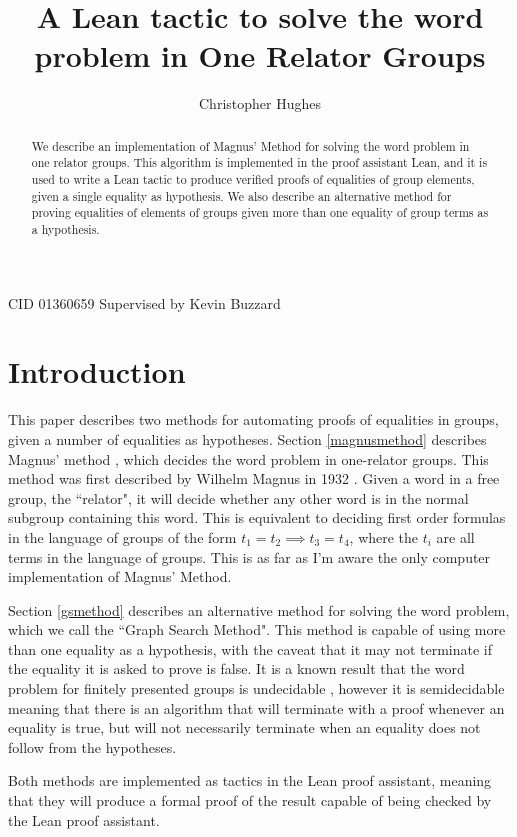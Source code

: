 \documentclass[12pt]{article} %
\title{A Lean tactic to solve the word problem in One Relator Groups}
\author{Christopher Hughes}
\theoremstyle{definition}
\theoremstyle{definition}
\theoremstyle{definition}
\theoremstyle{definition}
\begin{document}
\maketitle
CID 01360659 \newline
Supervised by Kevin Buzzard
\begin{abstract}
  We describe an implementation of Magnus' Method for solving the word problem in one relator
  groups. This algorithm is implemented in the proof assistant Lean, and it is used to
  write a Lean tactic to produce verified proofs of equalities of group elements, given
  a single equality as hypothesis. We also describe an alternative method for
  proving equalities of elements of groups given more than one equality of group terms
  as a hypothesis.
\end{abstract}
\pagebreak
\tableofcontents
\pagebreak

\section{Introduction}

This paper describes two methods for automating proofs of equalities in groups, given
a number of equalities as hypotheses. Section \ref{magnusmethod} describes Magnus' method
\cite{mccool_schupp_1973}, which decides the word problem in one-relator groups.
This method was first described by Wilhelm Magnus in 1932 \cite{magnus1932}. Given a word in
a free group, the ``relator", it will decide whether any other word is in the
normal subgroup containing this word. This is equivalent to deciding first order
formulas in the language of groups of the form $t_1 = t_2 \implies t_3 = t_4$,
where the $t_i$ are all terms in the language of groups.
This is as far as I'm aware the only computer implementation of Magnus' Method.

Section \ref{gsmethod} describes an alternative method for solving the word problem,
which we call the ``Graph Search Method".
This method is capable of using more than one equality as a hypothesis,
with the caveat that it may not terminate if the equality it is asked to prove is false.
It is a known result that the word problem for finitely presented groups is undecidable
\cite{collins1986}, however it is semidecidable meaning that  there is an algorithm
that will terminate with a proof whenever an equality is true, but will not necessarily
terminate when an equality does not follow from the hypotheses.

Both methods are implemented as tactics in the Lean proof assistant, meaning that
they will produce a formal proof of the result capable of being checked by the Lean
proof assistant.
\end{document}
